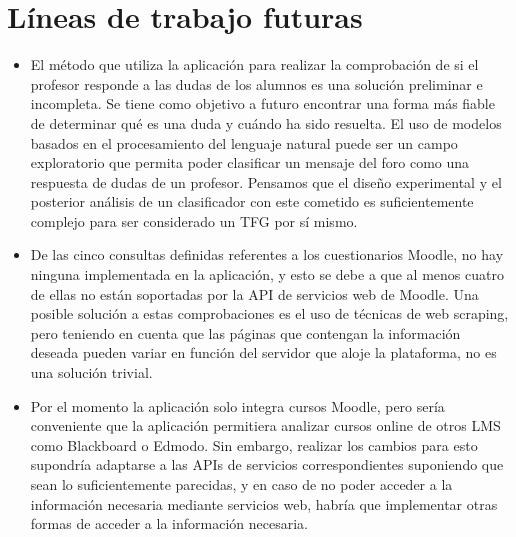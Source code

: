 
\section{Líneas de trabajo futuras}
\begin{itemize}
	\item
	El método que utiliza la aplicación para realizar la comprobación de si el profesor responde a las dudas de los alumnos es una solución preliminar e incompleta. Se tiene como objetivo a futuro encontrar una forma más fiable de determinar qué es una duda y cuándo ha sido resuelta.
	El uso de modelos basados en el procesamiento del lenguaje natural puede ser un campo exploratorio que permita poder clasificar un mensaje del foro como una respuesta de dudas de un profesor. Pensamos que el diseño experimental y el posterior análisis de un clasificador con este cometido es suficientemente complejo para ser considerado un TFG por sí mismo.
	\item
	De las cinco consultas definidas referentes a los cuestionarios Moodle, no hay ninguna implementada en la aplicación, y esto se debe a que al menos cuatro de ellas no están soportadas por la API de servicios web de Moodle.
	Una posible solución a estas comprobaciones es el uso de técnicas de web scraping, pero teniendo en cuenta que las páginas que contengan la información deseada pueden variar en función del servidor que aloje la plataforma, no es una solución trivial.
	\item
	Por el momento la aplicación solo integra cursos Moodle, pero sería conveniente que la aplicación permitiera analizar cursos online de otros LMS como Blackboard o Edmodo. Sin embargo, realizar los cambios para esto supondría adaptarse a las APIs de servicios correspondientes suponiendo que sean lo suficientemente parecidas, y en caso de no poder acceder a la información necesaria mediante servicios web, habría que implementar otras formas de acceder a la información necesaria.
\end{itemize}